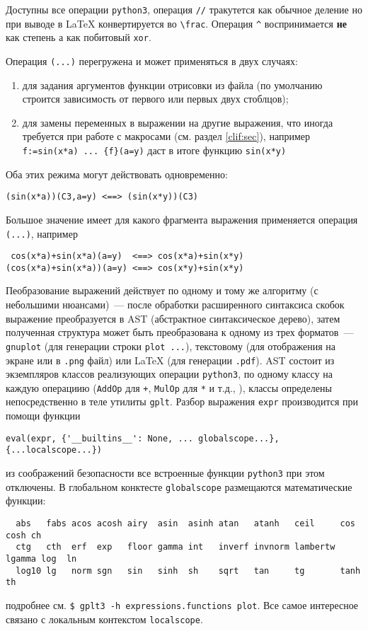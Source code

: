 \documentclass[12pt]{article}
\def\gplt{{\tt gplt}}
\def\gnuplot{{\tt gnuplot}}
\def\python{{\tt python3}}
\def\png{{\tt .png}}
\def\pdf{{\tt .pdf}}
\begin{document}
Доступны все операции \python{}, операция \verb'//' тракутется как обычное деление но при выводе в \LaTeX{} конвертируется во \verb'\frac'.
Операция \verb'^' воспринимается {\bf не} как степень а как побитовый \verb'xor'.

Операция \verb'(...)' перегружена и может применяться в двух случаях:
\begin{enumerate}
\item для задания аргументов функции отрисовки из файла (по умолчанию строится зависимость от первого или первых двух стоблцов);
\item для замены переменных в выражении на другие выражения, что иногда требуется при работе с макросами (см. раздел \ref{clif:sec}),
  например \verb'f:=sin(x*a) ... {f}(a=y)' даст в итоге функцию \verb'sin(x*y)'
\end{enumerate}
Оба этих режима могут действовать одновременно:
\begin{verbatim}
(sin(x*a))(C3,a=y) <==> (sin(x*y))(C3)
\end{verbatim}
Большое значение имеет для какого фрагмента выражения применяется операция \verb'(...)', например
\begin{verbatim}
 cos(x*a)+sin(x*a)(a=y)  <==> cos(x*a)+sin(x*y)
(cos(x*a)+sin(x*a))(a=y) <==> cos(x*y)+sin(x*y)
\end{verbatim}



Пеобразование выражений действует по одному и тому же алгоритму (с небольшими нюансами)~--- после обработки расширенного синтаксиса скобок выражение преобразуется в AST
(абстрактное синтаксическое дерево), затем полученная структура может быть преобразована к одному из трех форматов~--- \gnuplot{} (для генерации
строки \verb'plot ...'), текстовому (для отображения на экране или в \png{} файл) или \LaTeX{} (для генерации \pdf).
AST состоит из экземпляров классов реализующих операции \python, по одному классу на каждую операциию (\verb'AddOp' для \verb'+', \verb'MulOp' для \verb'*'
и т.д., \cite{aiv:symbalg:MM2015}),
классы определены непосредственно в теле утилиты \gplt. Разбор выражения \verb'expr' производится при помощи функции
\begin{verbatim}
eval(expr, {'__builtins__': None, ... globalscope...}, {...localscope...})
\end{verbatim}
из соображений безопасности все встроенные функции \python{} при этом отключены. В глобальном конктесте \verb'globalscope' размещаются математические функции:
\begin{verbatim}
  abs   fabs acos acosh airy  asin  asinh atan   atanh   ceil     cos    cosh ch   
  ctg   cth  erf  exp   floor gamma int   inverf invnorm lambertw lgamma log  ln
  log10 lg   norm sgn   sin   sinh  sh    sqrt   tan     tg       tanh   th 
\end{verbatim}
подробнее см. \verb'$ gplt3 -h expressions.functions plot'. Все самое интересное связано с локальным контекстом \verb'localscope'.
\end{document}
